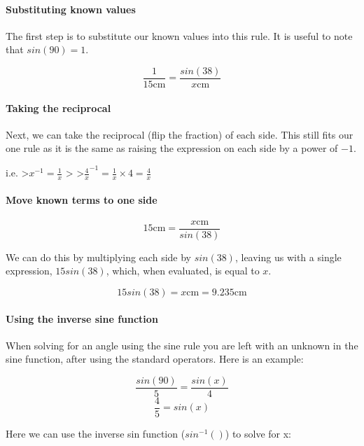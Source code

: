 \hypertarget{substituting-known-values}{%
\paragraph{Substituting known values}\label{substituting-known-values}}

The first step is to substitute our known values into this rule. It is useful to note that \(sin(90)=1\).

\[\frac{1}{15\mathrm{cm}}=\frac{sin(38 )}{x\mathrm{cm}}\]

\hypertarget{taking-the-reciprocal}{%
\paragraph{Taking the reciprocal}\label{taking-the-reciprocal}}

Next, we can take the reciprocal (flip the fraction) of each side. This still fits our one rule as it is the same as raising the expression on each side by a power of \(-1\).

i.e. \textgreater{}\(x^{-1}=\frac{1}{x}\) \textgreater{} \textgreater{}\(\frac{4}{x}^{-1}=\frac{1}{x}\times4=\frac{4}{x}\)

\hypertarget{move-known-terms-to-one-side}{%
\paragraph{Move known terms to one side}\label{move-known-terms-to-one-side}}

\[15\mathrm{cm}=\frac{x\mathrm{cm}}{sin(38)}\]

We can do this by multiplying each side by \(sin(38)\), leaving us with a single expression, \(15sin(38)\), which, when evaluated, is equal to \(x\).

\[15sin(38)=x\mathrm{cm}=9.235\mathrm{cm}\]

\hypertarget{using-the-inverse-sine-function}{%
\paragraph{Using the inverse sine function}\label{using-the-inverse-sine-function}}

When solving for an angle using the sine rule you are left with an unknown in the sine function, after using the standard operators. Here is an example:

\[\frac{sin(90)}{5}=\frac{sin(x)}{4}\] \[\frac{4}{5}=sin(x)\]

Here we can use the inverse sin function (\(sin^{-1}()\)) to solve for x:

